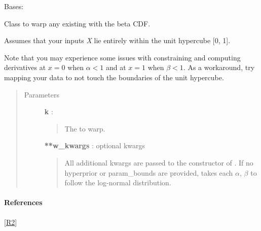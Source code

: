 \documentclass[letterpaper,10pt,english]{sphinxmanual}
\begin{document}

\begin{fulllineitems}
\label{gptools.kernel:gptools.kernel.warping.BetaWarpedKernel}
Bases: {\hyperref[gptools.kernel:gptools.kernel.warping.WarpedKernel]{}}

Class to warp any existing  with the beta CDF.

Assumes that your inputs \emph{X} lie entirely within the unit hypercube {[}0, 1{]}.

Note that you may experience some issues with constraining and computing
derivatives at \(x=0\) when \(\alpha < 1\) and at \(x=1\) when
\(\beta < 1\). As a workaround, try mapping your data to not touch the
boundaries of the unit hypercube.
\begin{quote}\begin{description}
\item[{Parameters}] \leavevmode
\textbf{k} : 
\begin{quote}

The  to warp.
\end{quote}

\textbf{**w\_kwargs} : optional kwargs
\begin{quote}

All additional kwargs are passed to the constructor of
{\hyperref[gptools.kernel:gptools.kernel.warping.WarpingFunction]{}}. If no hyperprior or param\_bounds are
provided, takes each \(\alpha\), \(\beta\) to follow the
log-normal distribution.
\end{quote}

\end{description}\end{quote}
\paragraph{References}

{\hyperref[gptools.kernel:r2]{{[}R2{]}}}

\end{fulllineitems}

\end{document}
